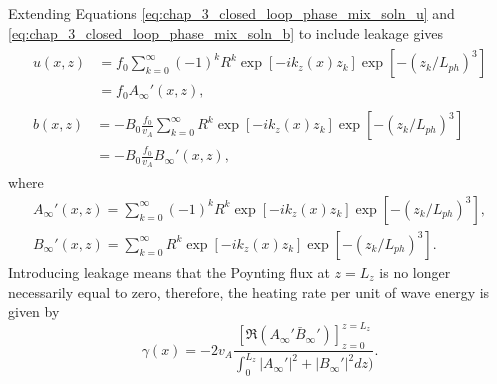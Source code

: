 Extending Equations \eqref{eq:chap_3_closed_loop_phase_mix_soln_u} and \eqref{eq:chap_3_closed_loop_phase_mix_soln_b} to include leakage gives
\begin{gather}
\label{eq:chap_3_full_soln_leaky_resistive_u}
\begin{aligned}
    u(x,z) &= f_0\sum_{k=0}^\infty(-1)^kR^k\exp[-ik_z(x)z_k]\exp[-(z_k/L_{ph})^3] \\
    &= f_0A_\infty'(x,z),
\end{aligned}
\\
\begin{aligned}
    b(x,z) &= -B_0\frac{f_0}{v_A}\sum_{k=0}^\infty R^k\exp[-ik_z(x)z_k]\exp[-(z_k/L_{ph})^3] \\
    &= -B_0\frac{f_0}{v_A}B_\infty'(x,z),
\end{aligned}
\end{gather}
where
\begin{gather}
    A_\infty'(x,z) = \sum_{k=0}^\infty(-1)^kR^k\exp[-ik_z(x)z_k]\exp[-(z_k/L_{ph})^3], \\
    B_\infty'(x,z) = \sum_{k=0}^\infty R^k\exp[-ik_z(x)z_k]\exp[-(z_k/L_{ph})^3].
\end{gather}
Introducing leakage means that the Poynting flux at $z=L_z$ is no longer necessarily equal to zero, therefore, the heating rate per unit of wave energy is given by
\begin{equation}
    \label{eq:gamma_exact_leaky_loop}
    \gamma(x) = -2v_A\frac{[\Re(A_\infty'\bar{B}_\infty')]_{z=0}^{z=L_z}}{\int_0^{L_z}|A_\infty'|^2+|B_\infty'|^2dz)}.
\end{equation}

